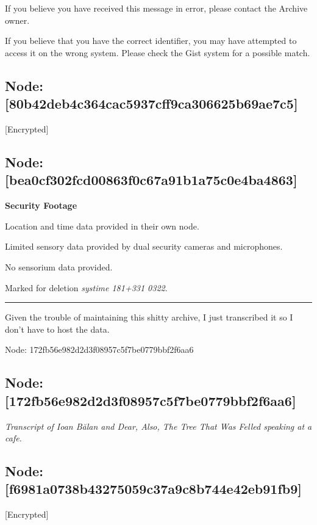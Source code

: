 If you believe you have received this message in error, please contact the Archive owner.

If you believe that you have the correct identifier, you may have attempted to access it on the wrong system. Please check the Gist system for a possible match.

\hypertarget{node-80b42deb4c364cac5937cff9ca306625b69ae7c5}{%
\subsection{Node: {[}80b42deb4c364cac5937cff9ca306625b69ae7c5{]}}\label{node-80b42deb4c364cac5937cff9ca306625b69ae7c5}}

{[}Encrypted{]}

\hypertarget{node-bea0cf302fcd00863f0c67a91b1a75c0e4ba4863}{%
\subsection{Node: {[}bea0cf302fcd00863f0c67a91b1a75c0e4ba4863{]}}\label{node-bea0cf302fcd00863f0c67a91b1a75c0e4ba4863}}

\textbf{Security Footage}

Location and time data provided in their own node.

Limited sensory data provided by dual security cameras and microphones.

No sensorium data provided.

Marked for deletion \emph{systime 181+331 0322}.

\begin{center}\rule{0.5\linewidth}{\linethickness}\end{center}

Given the trouble of maintaining this shitty archive, I just transcribed it so I don't have to host the data.

Node: 172fb56e982d2d3f08957c5f7be0779bbf2f6aa6

\hypertarget{node-172fb56e982d2d3f08957c5f7be0779bbf2f6aa6}{%
\subsection{Node: {[}172fb56e982d2d3f08957c5f7be0779bbf2f6aa6{]}}\label{node-172fb56e982d2d3f08957c5f7be0779bbf2f6aa6}}

\emph{Transcript of Ioan Bălan and Dear, Also, The Tree That Was Felled speaking at a cafe.}

\hypertarget{node-f6981a0738b43275059c37a9c8b744e42eb91fb9}{%
\subsection{Node: {[}f6981a0738b43275059c37a9c8b744e42eb91fb9{]}}\label{node-f6981a0738b43275059c37a9c8b744e42eb91fb9}}

{[}Encrypted{]}
